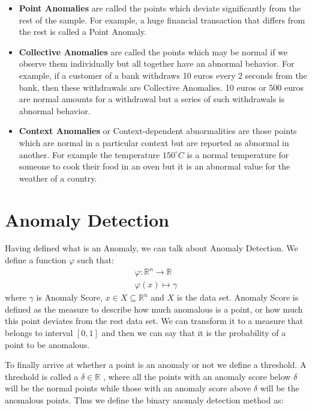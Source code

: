 \documentclass[a4paper,12pt]{report}
\theoremstyle{definitionNODot}
\begin{document}
	\begin{itemize}
		\item \textbf{Point Anomalies} are called the points which deviate significantly from the rest of the sample. For example, a huge financial transaction that differs from the rest is called a Point Anomaly.
		
		\item \textbf{Collective Anomalies} are called the points which may be normal if we observe them individually but all together have an abnormal behavior. For example, if a customer of a bank withdraws 10 euros every 2 seconds from the bank, then these withdrawals are Collective Anomalies. 10 euros or 500 euros are normal amounts for a withdrawal but a series of such withdrawals is abnormal behavior.
		
		\item \textbf{Context Anomalies} or Context-dependent abnormalities are those points which are normal in a particular context but are reported as abnormal in another. For example the temperature $150 ^\circ C$ is a normal temperature for someone to cook their food in an oven but it is an abnormal value for the weather of a country.
	\end{itemize}
	
	\section{Anomaly Detection}
	
	Having defined what is an Anomaly, we can talk about Anomaly Detection. We define a function $ \varphi $ such that:
	\begin{align*}
		\varphi \colon \mathbb{R}^n \rightarrow \mathbb{R} \\
		\varphi(x)\mapsto\gamma
	\end{align*}
	where $ \gamma $ is Anomaly Score, $ x \in X \subseteq \mathbb{R}^n $ and $ X $ is the data set. Anomaly Score is defined as the measure to describe how much anomalous is a point, or how much this point deviates from the rest data set. We can transform it to a measure that belongs to interval $ [0,1] $ and then we can say that it is the probability of a point to be anomalous.
	
	To finally arrive at whether a point is an anomaly or not we define a threshold. A threshold is called a $ \delta \in \mathbb{R} $ , where all the points with an anomaly score below $ \delta $ will be the normal points while those with an anomaly score above $ \delta $ will be the anomalous points. Thus we define the binary anomaly detection method as:
	
\end{document}
